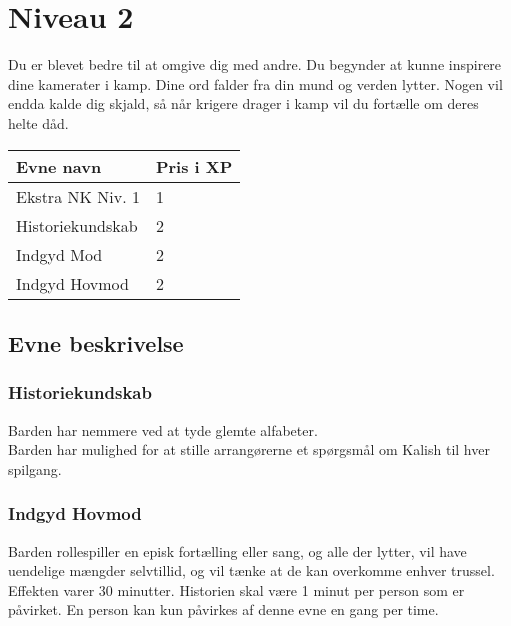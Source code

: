 \chapter*{Niveau 2}
Du er blevet bedre til at omgive dig med andre. Du begynder at kunne inspirere dine kamerater i kamp. Dine ord falder fra din mund og verden lytter. Nogen vil endda kalde dig skjald, så når krigere drager i kamp vil du fortælle om deres helte dåd.
\begin{table}[H]
    \centering
    \begin{tabular}{|p{}|p{}|}
    \rowcolor{cerulean!80}\hline
    Evne navn & Pris i XP \\\hline
       Ekstra NK Niv. 1 & 1 \\\hline
       Historiekundskab & 2 \\\hline
       Indgyd Mod & 2 \\\hline
       Indgyd Hovmod & 2 \\\hline
    \end{tabular}
\end{table}
\section*{Evne beskrivelse}



\subsection*{Historiekundskab}
Barden har nemmere ved at tyde glemte alfabeter.\\
Barden har mulighed for at stille arrangørerne et spørgsmål om Kalish til hver spilgang.

\subsection*{Indgyd Hovmod}
Barden rollespiller en episk fortælling eller sang, og alle der lytter, vil have uendelige mængder selvtillid, og vil tænke at de kan overkomme enhver trussel. Effekten varer 30 minutter. Historien skal være 1 minut per person som er påvirket. En person kan kun påvirkes af denne evne en gang per time.


